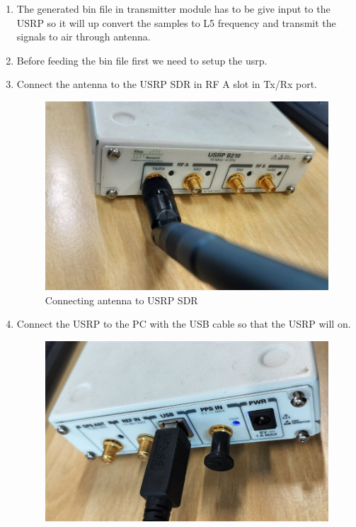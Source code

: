 \begin{enumerate}
    \item The generated bin file in transmitter module has to be give input to the USRP so it will up convert the samples to L5 frequency and transmit the signals to air through antenna.
    \item Before feeding the bin file first we need to setup the usrp.
    \item Connect the antenna  to the USRP SDR in RF A slot in Tx/Rx port.
    \begin{normalsize}
        \begin{figure}[ht]
        \centering
        \includegraphics[width=1\textwidth]{figs/usrp_antenna.png}
        \centering
        \captionsetup{justification=centering}
        \caption{Connecting antenna to USRP SDR}
        \end{figure}
    \end{normalsize}
    \item Connect the USRP to the PC with the USB cable so that the USRP will on.
    \begin{normalsize}
    \begin{figure}[ht]
        \centering
        \includegraphics[width=1\textwidth]{figs/usrp_usb.png}

\end{figure}
\end{normalsize}
\end{enumerate}
